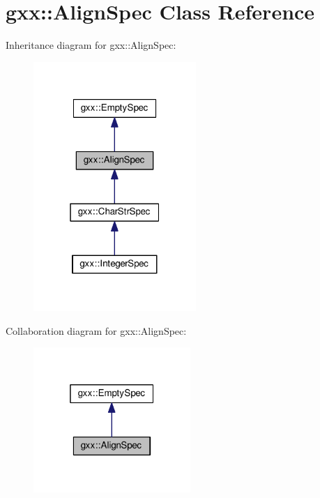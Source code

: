 \hypertarget{classgxx_1_1AlignSpec}{}\section{gxx\+:\+:Align\+Spec Class Reference}
\label{classgxx_1_1AlignSpec}


Inheritance diagram for gxx\+:\+:Align\+Spec\+:
\nopagebreak
\begin{figure}[H]
\begin{center}
\leavevmode
\includegraphics[width=175pt]{classgxx_1_1AlignSpec__inherit__graph}
\end{center}
\end{figure}


Collaboration diagram for gxx\+:\+:Align\+Spec\+:
\nopagebreak
\begin{figure}[H]
\begin{center}
\leavevmode
\includegraphics[width=169pt]{classgxx_1_1AlignSpec__coll__graph}
\end{center}
\end{figure}
